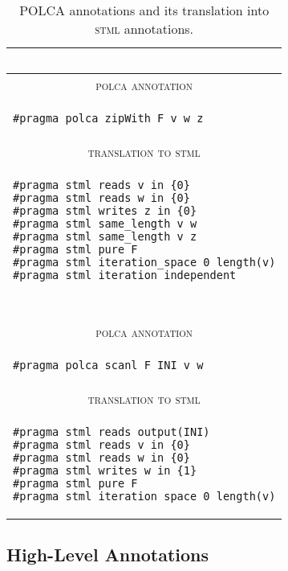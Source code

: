 \documentclass[svgnames,usenames,preprint,nocopyrightspace]{sigplanconf}
\newcommand{\stml}{\textsc{stml}\xspace}
\begin{document}
\begin{table}
\begin{tabular}{|l|}
\multicolumn{1}{c}{~}\\

\hline  
\multicolumn{1}{|c|}{\textsc{polca annotation}}\\
\hline
\begin{lstlisting}[basicstyle = \ttfamily\scriptsize]
#pragma polca zipWith F v w z
\end{lstlisting}\\
\hline
\multicolumn{1}{|c|}{\textsc{translation to} \stml}\\
\hline  
\begin{lstlisting}[basicstyle = \ttfamily\scriptsize]
#pragma stml reads v in {0}
#pragma stml reads w in {0}
#pragma stml writes z in {0}
#pragma stml same_length v w
#pragma stml same_length v z
#pragma stml pure F
#pragma stml iteration_space 0 length(v)
#pragma stml iteration_independent
\end{lstlisting}\\
\hline

\multicolumn{1}{c}{~}\\

\hline  
\multicolumn{1}{|c|}{\textsc{polca annotation}}\\
\hline
\begin{lstlisting}[basicstyle = \ttfamily\scriptsize]
#pragma polca scanl F INI v w
\end{lstlisting}\\
\hline
\multicolumn{1}{|c|}{\textsc{translation to} \stml}\\
\hline  
\begin{lstlisting}[basicstyle = \ttfamily\scriptsize]
#pragma stml reads output(INI)
#pragma stml reads v in {0}
#pragma stml reads w in {0}
#pragma stml writes w in {1}
#pragma stml pure F
#pragma stml iteration_space 0 length(v)
\end{lstlisting}\\
\hline 
\end{tabular}
\caption{POLCA annotations and its translation into \stml annotations.}
\label{tab:polca_stml_translation}
\end{table}




\subsection{High-Level Annotations}
\label{sec:high_level_ann}
\end{document}
